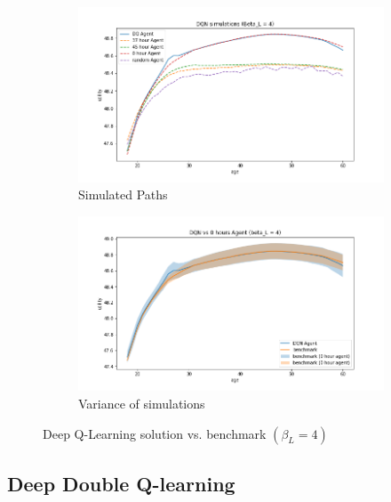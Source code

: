 \begin{figure}[ht]
\begin{subfigure}{.5\textwidth}
  \centering
  \includegraphics[width=1\linewidth]{figures/dqn_model1_beta_4_solution_benchmark_paths.png}
  \caption{Simulated Paths}
  \label{fig:dqn_solution_beta4_path}
\end{subfigure}%
\begin{subfigure}{.5\textwidth}
  \centering
  \includegraphics[width=1\linewidth]{figures/dqn_model1_beta_4_solution_benchmark_variance.png}
  \caption{Variance of simulations}
  \label{fig:dqn_solution_beta4_var}
\end{subfigure}
    \caption{Deep Q-Learning solution vs. benchmark $(\beta_L = 4)$}
    \label{fig:dqn_solution_beta4}
\end{figure}


\subsection{Deep Double Q-learning}

